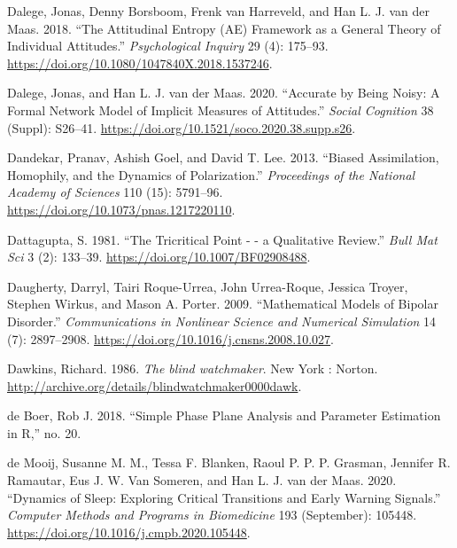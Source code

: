 \documentclass[
  a4paper,
  DIV=11,
  numbers=noendperiod]{scrreprt}
\newlength{\cslhangindent}
\newlength{\cslentryspacingunit} %
\newenvironment{CSLReferences}[2] %
 {%
  \setlength{\parindent}{0pt}
  \ifodd #1
  \let\oldpar\par
  \def\par{\hangindent=\cslhangindent\oldpar}
  \fi
  \setlength{\parskip}{#2\cslentryspacingunit}
 }%
 {}
\begin{document}
\begin{CSLReferences}{1}{0}
\leavevmode{}%
Dalege, Jonas, Denny Borsboom, Frenk van Harreveld, and Han L. J. van
der Maas. 2018. {``The {Attitudinal Entropy} ({AE}) Framework as a
General Theory of Individual Attitudes.''} \emph{Psychological Inquiry}
29 (4): 175--93. \url{https://doi.org/10.1080/1047840X.2018.1537246}.

\leavevmode{}%
Dalege, Jonas, and Han L. J. van der Maas. 2020. {``Accurate by Being
Noisy: {A} Formal Network Model of Implicit Measures of Attitudes.''}
\emph{Social Cognition} 38 (Suppl): S26--41.
\url{https://doi.org/10.1521/soco.2020.38.supp.s26}.

\leavevmode{}%
Dandekar, Pranav, Ashish Goel, and David T. Lee. 2013. {``Biased
Assimilation, Homophily, and the Dynamics of Polarization.''}
\emph{Proceedings of the National Academy of Sciences} 110 (15):
5791--96. \url{https://doi.org/10.1073/pnas.1217220110}.

\leavevmode{}%
Dattagupta, S. 1981. {``The Tricritical Point - - a Qualitative
Review.''} \emph{Bull Mat Sci} 3 (2): 133--39.
\url{https://doi.org/10.1007/BF02908488}.

\leavevmode{}%
Daugherty, Darryl, Tairi Roque-Urrea, John Urrea-Roque, Jessica Troyer,
Stephen Wirkus, and Mason A. Porter. 2009. {``Mathematical Models of
Bipolar Disorder.''} \emph{Communications in Nonlinear Science and
Numerical Simulation} 14 (7): 2897--2908.
\url{https://doi.org/10.1016/j.cnsns.2008.10.027}.

\leavevmode{}%
Dawkins, Richard. 1986. \emph{The blind watchmaker}. New York : Norton.
\url{http://archive.org/details/blindwatchmaker0000dawk}.

\leavevmode{}%
de Boer, Rob J. 2018. {``Simple Phase Plane Analysis and Parameter
Estimation in {R},''} no. 20.

\leavevmode{}%
de Mooij, Susanne M. M., Tessa F. Blanken, Raoul P. P. P. Grasman,
Jennifer R. Ramautar, Eus J. W. Van Someren, and Han L. J. van der Maas.
2020. {``Dynamics of Sleep: {Exploring} Critical Transitions and Early
Warning Signals.''} \emph{Computer Methods and Programs in Biomedicine}
193 (September): 105448.
\url{https://doi.org/10.1016/j.cmpb.2020.105448}.


\end{CSLReferences}
\end{document}
